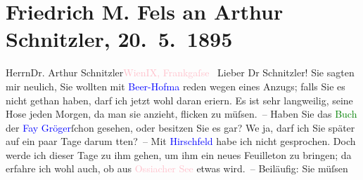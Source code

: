 

               \section[Friedrich M. Fels an Arthur Schnitzler, 20. 5. 1895]{ Friedrich M. Fels an Arthur Schnitzler, 20. 5. 1895}\nopagebreak{}\rehead{ }\normalsize\beginnumbering{} \toendnotes[C]{\smallbreak\pagebreak[2]} 
\toendnotes[C]{\smallbreak}\pstart{}{\pb}Herrn\pend{}\pstart{}Dr. Arthur Schnitzler\pend{}\pstart{}\textcolor{pink}{Wien}{}\ledrightnote{\textcolor{pink}{Wien}}\pend{}\pstart{}\textcolor{pink}{IX, Frankgaſse }{}\ledrightnote{\textcolor{pink}{Frankgasse}}\pend{}{\bigskip}\pstart
           \noindent{}{\pb}Lieber Dr Schnitzler!  Sie sagten mir neulich, Sie wollten mit \textcolor{blue}{Beer-Hofma{\geminationn}}{}\ledrightnote{\textcolor{blue}{Richard Beer-Hofmann}} reden wegen eines Anzugs; falls Sie es nicht gethan haben, darf ich jetzt wohl
               daran eri{\geminationn}ern. Es ist sehr langweilig, seine Hose jeden
               Morgen, da man sie anzieht, flicken zu müſsen. – Haben Sie das \textcolor{green}{Buch}{} der \textcolor{blue}{Fa{\geminationn}y Gröger}{}\ledrightnote{\textcolor{blue}{Fanny Gröger}}{ }ſchon gesehen, oder besitzen Sie es gar? We{\geminationn} ja, darf ich Sie später auf ein paar Tage darum
                  tten? – Mit \textcolor{blue}{Hirschfeld}{}\ledrightnote{\textcolor{blue}{Robert Hirschfeld}} habe ich nicht
               gesprochen. Doch werde ich dieser Tage zu ihm gehen, um ihm ein neues Feuilleton zu
               bringen; da{\geminationn} erfahre ich wohl auch, ob aus \textcolor{pink}{Ossiacher See}{}\ledrightnote{\textcolor{pink}{Ossiacher See}} etwas wird. – Beiläufig: Sie müſsen
